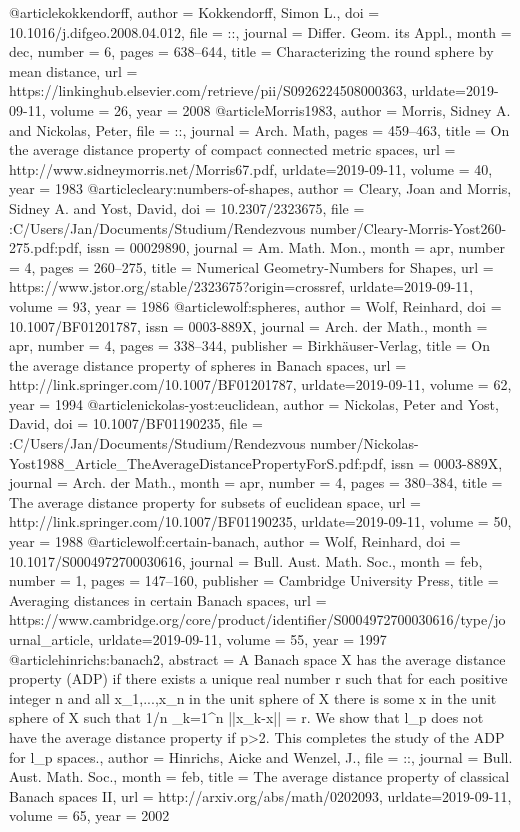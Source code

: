 @article{kokkendorff,
author = {Kokkendorff, Simon L.},
doi = {10.1016/j.difgeo.2008.04.012},
file = {::},
journal = {Differ. Geom. its Appl.},
month = {dec},
number = {6},
pages = {638--644},
title = {{Characterizing the round sphere by mean distance}},
url = {https://linkinghub.elsevier.com/retrieve/pii/S0926224508000363},
urldate={2019-09-11},
volume = {26},
year = {2008}
}
@article{Morris1983,
author = {Morris, Sidney A. and Nickolas, Peter},
file = {::},
journal = {Arch. Math},
pages = {459--463},
title = {{On the average distance property of compact connected metric spaces}},
url = {http://www.sidneymorris.net/Morris67.pdf},
urldate={2019-09-11},
volume = {40},
year = {1983}
}
@article{cleary:numbers-of-shapes,
author = {Cleary, Joan and Morris, Sidney A. and Yost, David},
doi = {10.2307/2323675},
file = {:C\:/Users/Jan/Documents/Studium/Rendezvous number/Cleary-Morris-Yost260-275.pdf:pdf},
issn = {00029890},
journal = {Am. Math. Mon.},
month = {apr},
number = {4},
pages = {260--275},
title = {{Numerical Geometry-Numbers for Shapes}},
url = {https://www.jstor.org/stable/2323675?origin=crossref},
urldate={2019-09-11},
volume = {93},
year = {1986}
}
@article{wolf:spheres,
author = {Wolf, Reinhard},
doi = {10.1007/BF01201787},
issn = {0003-889X},
journal = {Arch. der Math.},
month = {apr},
number = {4},
pages = {338--344},
publisher = {Birkh{\"{a}}user-Verlag},
title = {{On the average distance property of spheres in Banach spaces}},
url = {http://link.springer.com/10.1007/BF01201787},
urldate={2019-09-11},
volume = {62},
year = {1994}
}
@article{nickolas-yost:euclidean,
author = {Nickolas, Peter and Yost, David},
doi = {10.1007/BF01190235},
file = {:C\:/Users/Jan/Documents/Studium/Rendezvous number/Nickolas-Yost1988_Article_TheAverageDistancePropertyForS.pdf:pdf},
issn = {0003-889X},
journal = {Arch. der Math.},
month = {apr},
number = {4},
pages = {380--384},
title = {{The average distance property for subsets of euclidean space}},
url = {http://link.springer.com/10.1007/BF01190235},
urldate={2019-09-11},
volume = {50},
year = {1988}
}
@article{wolf:certain-banach,
author = {Wolf, Reinhard},
doi = {10.1017/S0004972700030616},
journal = {Bull. Aust. Math. Soc.},
month = {feb},
number = {1},
pages = {147--160},
publisher = {Cambridge University Press},
title = {{Averaging distances in certain Banach spaces}},
url = {https://www.cambridge.org/core/product/identifier/S0004972700030616/type/journal_article},
urldate={2019-09-11},
volume = {55},
year = {1997}
}
@article{hinrichs:banach2,
abstract = {A Banach space X has the average distance property (ADP) if there exists a unique real number r such that for each positive integer n and all x_1,...,x_n in the unit sphere of X there is some x in the unit sphere of X such that 1/n \sum_{k=1}^n ||x_k-x|| = r. We show that l_p does not have the average distance property if p>2. This completes the study of the ADP for l_p spaces.},
author = {Hinrichs, Aicke and Wenzel, J.},
file = {::},
journal = {Bull. Aust. Math. Soc.},
month = {feb},
title = {{The average distance property of classical Banach spaces II}},
url = {http://arxiv.org/abs/math/0202093},
urldate={2019-09-11},
volume = {65},
year = {2002}
}
